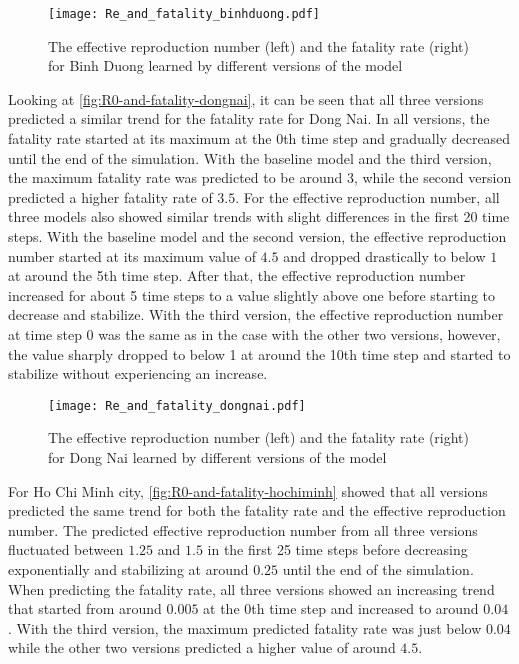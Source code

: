 \begin{figure}[!htb]
    \centering
    \texttt{[image: Re\_and\_fatality\_binhduong.pdf]}
    \caption{The effective reproduction number (left) and the fatality rate (right) for Binh Duong learned by different versions of the model}
    \label{fig:R0-and-fatality-binhduong}
\end{figure}

Looking at \autoref{fig:R0-and-fatality-dongnai}, it can be seen that all three versions predicted a similar trend for the fatality rate for Dong Nai.
In all versions, the fatality rate started at its maximum at the 0th time step and gradually decreased until the end of the simulation.
With the baseline model and the third version, the maximum fatality rate was predicted to be around $3$, while the second version predicted a higher fatality rate of $3.5$.
For the effective reproduction number, all three models also showed similar trends with slight differences in the first 20 time steps.
With the baseline model and the second version, the effective reproduction number started at its maximum value of $4.5$ and dropped drastically to below $1$ at around the 5th time step.
After that, the effective reproduction number increased for about 5 time steps to a value slightly above one before starting to decrease and stabilize.
With the third version, the effective reproduction number at time step 0 was the same as in the case with the other two versions, however, the value sharply dropped to below 1 at around the 10th time step and started to stabilize without experiencing an increase.

\begin{figure}[!htb]
    \centering
    \texttt{[image: Re\_and\_fatality\_dongnai.pdf]}
    \caption{The effective reproduction number (left) and the fatality rate (right) for Dong Nai learned by different versions of the model}
    \label{fig:R0-and-fatality-dongnai}
\end{figure}

For Ho Chi Minh city, \autoref{fig:R0-and-fatality-hochiminh} showed that all versions predicted the same trend for both the fatality rate and the effective reproduction number.
The predicted effective reproduction number from all three versions fluctuated between $1.25$ and $1.5$ in the first 25 time steps before decreasing exponentially and stabilizing at around $0.25$ until the end of the simulation.
When predicting the fatality rate, all three versions showed an increasing trend that started from around $0.005$ at the 0th time step and increased to around $0.04$.
With the third version, the maximum predicted fatality rate was just below $0.04$ while the other two versions predicted a higher value of around $4.5$.

